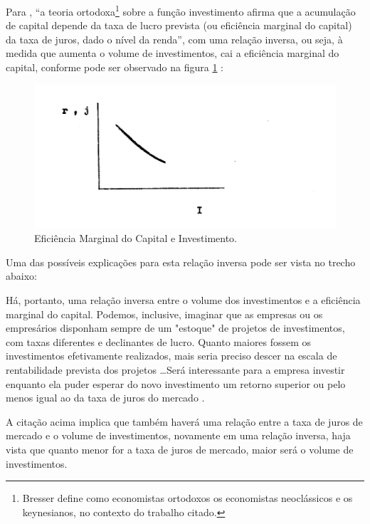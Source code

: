 \documentclass[
	12pt,				%
	oneside,			%
	a4paper,			%
	chapter=TITLE,		%
	section=TITLE,		%
	english,			%
	brazil				%
	]{abntex2}
\begin{document}
Para \textcite{Bresser-Pereira1973}, ``a teoria ortodoxa\footnote{Bresser
  define como economistas ortodoxos os economistas neoclássicos e os
  keynesianos, no contexto do trabalho citado.} sobre a função
investimento afirma que a acumulação de capital depende da taxa de lucro
prevista (ou eficiência marginal do capital) da taxa de juros, dado o
nível da renda'', com uma relação inversa, ou seja, à medida que aumenta
o volume de investimentos, cai a eficiência marginal do capital,
conforme pode ser observado na figura \ref{fig:eficienciamarginal}
\autocite[4]{Bresser-Pereira1973}:
\begin{figure}[H]

{\centering \includegraphics[width=0.8\linewidth]{images/Page-4-Image-1} 

}

\caption{Eficiência Marginal do Capital e Investimento.}\label{fig:eficienciamarginal}
\end{figure}
Uma das possíveis explicações para esta relação inversa pode ser vista
no trecho abaixo:
\begin{citacao}
Há, portanto, uma relação inversa entre o volume dos investimentos e a
eficiência marginal do capital. Podemos, inclusive, imaginar que as empresas ou
os empresários disponham sempre de um "estoque" de projetos de investimentos,
com taxas diferentes e declinantes de lucro. Quanto maiores fossem os
investimentos efetivamente realizados, mais seria preciso descer na escala de
rentabilidade prevista dos projetos \ldots Será interessante para a empresa
investir enquanto ela puder esperar do novo investimento um retorno superior ou
pelo menos igual ao da taxa de juros do mercado
\cite[p.~5]{Bresser-Pereira1973}.
\end{citacao}
A citação acima implica que também haverá uma relação entre a taxa de
juros de mercado e o volume de investimentos, novamente em uma relação
inversa, haja vista que quanto menor for a taxa de juros de mercado,
maior será o volume de investimentos.
\end{document}
